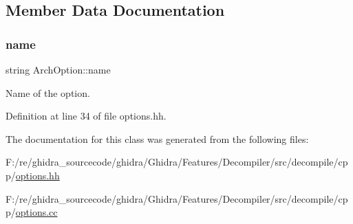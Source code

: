 \subsection{Member Data Documentation}
\mbox{\label{class_arch_option_a4c9a1914e575636d12be5c3ecc4aede3}} 
\subsubsection{\texorpdfstring{name}{name}}
{\footnotesize\ttfamily string Arch\+Option\+::name\hspace{0.3cm}{\ttfamily [protected]}}



Name of the option. 



Definition at line 34 of file options.\+hh.



The documentation for this class was generated from the following files\+:\begin{DoxyCompactItemize}
\item 
F\+:/re/ghidra\+\_\+sourcecode/ghidra/\+Ghidra/\+Features/\+Decompiler/src/decompile/cpp/\mbox{\hyperlink{options_8hh}{options.\+hh}}\item 
F\+:/re/ghidra\+\_\+sourcecode/ghidra/\+Ghidra/\+Features/\+Decompiler/src/decompile/cpp/\mbox{\hyperlink{options_8cc}{options.\+cc}}\end{DoxyCompactItemize}
